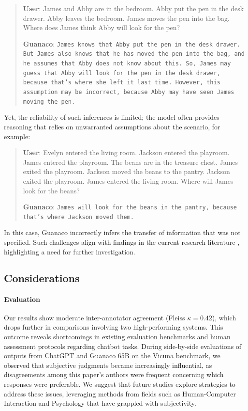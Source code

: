 \begin{quote}
    \textbf{User}: James and Abby are in the bedroom. Abby put the pen in the desk drawer. Abby leaves the bedroom. James moves the pen into the bag. Where does James think Abby will look for the pen?

    \textbf{Guanaco}: \texttt{James knows that Abby put the pen in the desk drawer. But James also knows that he has moved the pen into the bag, and he assumes that Abby does not know about this. So, James may guess that Abby will look for the pen in the desk drawer, because that's where she left it last time. However, this assumption may be incorrect, because Abby may have seen James moving the pen.}
\end{quote}

Yet, the reliability of such inferences is limited; the model often provides reasoning that relies on unwarranted assumptions about the scenario, for example:

\begin{quote}
    \textbf{User}: Evelyn entered the living room. Jackson entered the playroom. James entered the playroom. The beans are in the treasure chest. James exited the playroom. Jackson moved the beans to the pantry. Jackson exited the playroom. James entered the living room. Where will James look for the beans?

    \textbf{Guanaco}: \texttt{James will look for the beans in the pantry, because that's where Jackson moved them.}
\end{quote}

In this case, {Guanaco} incorrectly infers the transfer of information that was not specified. Such challenges align with findings in the current research literature \cite{sap2022neural}, highlighting a need for further investigation.

\subsection{Considerations}
\label{ssec:considerations}

\paragraph{Evaluation}

Our results show moderate inter-annotator agreement (Fleiss $\kappa=0.42$), which drops further in comparisons involving two high-performing systems. This outcome reveals shortcomings in existing evaluation benchmarks and human assessment protocols regarding chatbot tasks. During side-by-side evaluations of outputs from ChatGPT and {Guanaco} 65B on the Vicuna benchmark, we observed that subjective judgments became increasingly influential, as disagreements among this paper’s authors were frequent concerning which responses were preferable. We suggest that future studies explore strategies to address these issues, leveraging methods from fields such as Human-Computer Interaction and Psychology that have grappled with subjectivity.

